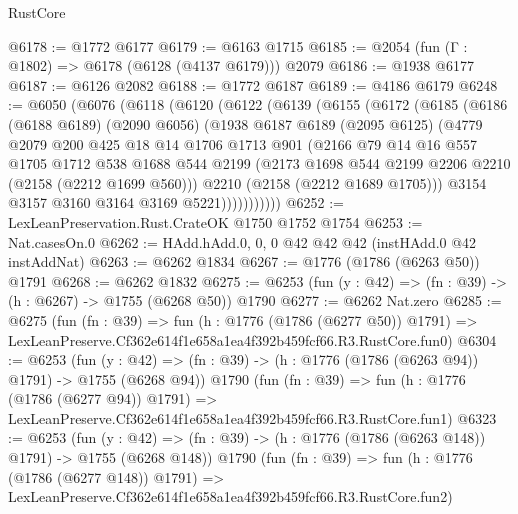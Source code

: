\begin{lexlean}{RustCore}
\begin{coremodule}
@6178 := @1772 @6177
@6179 := @6163 @1715
@6185 := @2054 (fun (Γ : @1802) => @6178 (@6128 (@4137 @6179))) @2079
@6186 := @1938 @6177
@6187 := @6126 @2082
@6188 := @1772 @6187
@6189 := @4186 @6179
@6248 := @6050
    (@6076
      (@6118
        (@6120
          (@6122
            (@6139
              (@6155
                (@6172
                  (@6185
                    (@6186
                      (@6188 @6189)
                      (@2090 @6056)
                      (@1938
                        @6187
                        @6189
                        (@2095 @6125)
                        (@4779
                          @2079
                          @200
                          @425
                          @18
                          @14
                          @1706
                          @1713
                          @901
                          (@2166
                            @79
                            @14
                            @16
                            @557
                            @1705
                            @1712
                            @538
                            @1688
                            @544
                            @2199
                            (@2173 @1698 @544 @2199 @2206 @2210 (@2158 (@2212 @1699 @560)))
                            @2210
                            (@2158 (@2212 @1689 @1705)))
                          @3154
                          @3157
                          @3160
                          @3164
                          @3169
                          @5221)))))))))))
@6252 := LexLeanPreservation.Rust.CrateOK @1750 @1752 @1754
@6253 := Nat.casesOn.{0}
@6262 := HAdd.hAdd.{0, 0, 0} @42 @42 @42 (instHAdd.{0} @42 instAddNat)
@6263 := @6262 @1834
@6267 := @1776 (@1786 (@6263 @50)) @1791
@6268 := @6262 @1832
@6275 := @6253 (fun (y : @42) => (fn : @39) -> (h : @6267) -> @1755 (@6268 @50)) @1790
@6277 := @6262 Nat.zero
@6285 := @6275
    (fun (fn : @39) =>
    fun (h : @1776 (@1786 (@6277 @50)) @1791) =>
    LexLeanPreserve.Cf362e614f1e658a1ea4f392b459fcf66.R3.RustCore.fun0)
@6304 := @6253
    (fun (y : @42) => (fn : @39) -> (h : @1776 (@1786 (@6263 @94)) @1791) -> @1755 (@6268 @94))
    @1790
    (fun (fn : @39) =>
    fun (h : @1776 (@1786 (@6277 @94)) @1791) =>
    LexLeanPreserve.Cf362e614f1e658a1ea4f392b459fcf66.R3.RustCore.fun1)
@6323 := @6253
    (fun (y : @42) => (fn : @39) -> (h : @1776 (@1786 (@6263 @148)) @1791) -> @1755 (@6268 @148))
    @1790
    (fun (fn : @39) =>
    fun (h : @1776 (@1786 (@6277 @148)) @1791) =>
    LexLeanPreserve.Cf362e614f1e658a1ea4f392b459fcf66.R3.RustCore.fun2)

\end{coremodule}
\end{lexlean}
